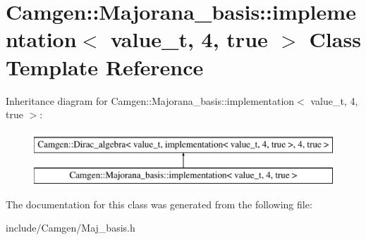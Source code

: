 \hypertarget{a00306}{}\section{Camgen\+:\+:Majorana\+\_\+basis\+:\+:implementation$<$ value\+\_\+t, 4, true $>$ Class Template Reference}
\label{a00306}
Inheritance diagram for Camgen\+:\+:Majorana\+\_\+basis\+:\+:implementation$<$ value\+\_\+t, 4, true $>$\+:\begin{figure}[H]
\begin{center}
\leavevmode
\includegraphics[height=2.000000cm]{a00306}
\end{center}
\end{figure}


The documentation for this class was generated from the following file\+:\begin{DoxyCompactItemize}
\item 
include/\+Camgen/Maj\+\_\+basis.\+h\end{DoxyCompactItemize}

